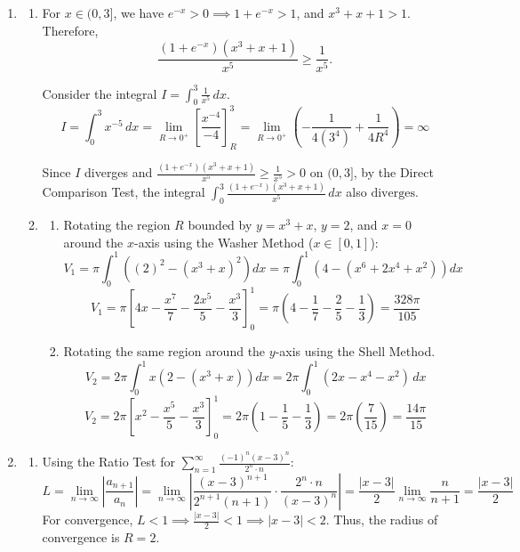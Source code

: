 \documentclass[a4paper, 12pt]{article}
\begin{document}
\begin{enumerate}[leftmargin=*,label=\textbf{\arabic*.}]
\begin{enumerate}[leftmargin=*,label=\textbf{\alph*.}]
\begin{enumerate}[leftmargin=*,label=\textbf{\roman*.}]
\end{enumerate}
\end{enumerate}

\item \begin{enumerate}[leftmargin=*,label=\textbf{\alph*.}]
\item For $x \in (0, 3]$, we have $e^{-x} > 0 \implies 1 + e^{-x} > 1$, and $x^3 + x + 1 > 1$. Therefore,
\[\frac{(1+e^{-x})(x^3+x+1)}{x^5} \ge \frac{1}{x^5}.\]

Consider the integral $I = \int_{0}^{3} \frac{1}{x^5} \, dx$.
\[I=\int_{0}^{3} x^{-5} \, dx = \lim_{R \to 0^+} \left[ \frac{x^{-4}}{-4} \right]_{R}^{3} = \lim_{R \to 0^+} \left( -\frac{1}{4(3^4)} + \frac{1}{4R^4} \right) = \infty\]

Since $I$ diverges and $\frac{(1+e^{-x})(x^3+x+1)}{x^5} \ge \frac{1}{x^5} > 0$ on $(0, 3]$, by the Direct Comparison Test, the integral $\int_{0}^{3} \frac{(1+e^{-x})(x^3+x+1)}{x^5} \, dx$ also $\boxed{\text{diverges}}$.

\item \begin{enumerate}[leftmargin=*,label=\textbf{\roman*.}]
\item Rotating the region $R$ bounded by $y = x^3+x$, $y = 2$, and $x = 0$ around the $x$-axis using the Washer Method ($x \in [0, 1]$):
\[V_1 = \pi \int_{0}^{1} \left( (2)^2 - (x^3+x)^2 \right) dx = \pi \int_{0}^{1} \left( 4 - (x^6 + 2x^4 + x^2) \right) dx\]
\[V_1=\pi\left[4x-\frac{x^7}7-\frac{2x^5}5-\frac{x^3}3\right]_0^1=\pi\left(4-\frac17-\frac25-\frac13\right)=\boxed{\frac{328\pi}{105}}\]

\item Rotating the same region around the $y$-axis using the Shell Method.
\[V_2=2\pi\int_0^1x\left(2-(x^3+x) \right) dx = 2\pi \int_{0}^{1} (2x - x^4 - x^2) \, dx\]
\[V_2=2\pi\left[x^2-\frac{x^5}5-\frac{x^3}3\right]_0^1=2\pi\left(1-\frac15-\frac13\right)=2\pi \left(\frac7{15}\right)=\boxed{\frac{14\pi}{15}}\]
\end{enumerate}
\end{enumerate}

\item \begin{enumerate}[leftmargin=*,label=\textbf{\alph*.}]
\item Using the Ratio Test for $\sum_{n=1}^{\infty} \frac{(-1)^n (x-3)^n}{2^n \cdot n}$:
\[L = \lim_{n \to \infty} \left| \frac{a_{n+1}}{a_n} \right| = \lim_{n \to \infty} \left| \frac{(x-3)^{n+1}}{2^{n+1}(n+1)} \cdot \frac{2^n \cdot n}{(x-3)^n} \right| = \frac{|x-3|}{2} \lim_{n \to \infty} \frac{n}{n+1} = \frac{|x-3|}{2}\]
For convergence, $L < 1 \implies \frac{|x-3|}{2} < 1 \implies |x-3| < 2$.
Thus, the radius of convergence is $\boxed{R = 2}$.


\end{enumerate}
\end{enumerate}
\end{document}
